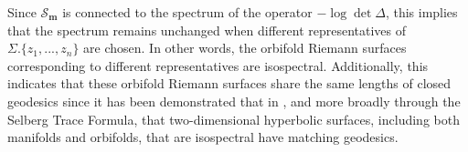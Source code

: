 \documentclass[a4paper,11pt]{article}
\newcommand{\Gpotential}{\mathscr{S}}
\begin{document}
Since  $\Gpotential_{\boldsymbol{m}}$ is connected to the spectrum of the operator  $-\log\det\Delta$, this implies that the spectrum remains unchanged when different representatives of $\Sigma.\{z_1,...,z_n\}$ are chosen. In other words, the orbifold Riemann surfaces corresponding to different representatives are isospectral. Additionally, this indicates that these orbifold Riemann surfaces share the same lengths of closed geodesics since it has been demonstrated that in \cite{doyle2006isospectral}, and more broadly through the Selberg Trace Formula,  that two-dimensional hyperbolic surfaces, including both manifolds and orbifolds, that are isospectral have matching geodesics.
\end{document}

